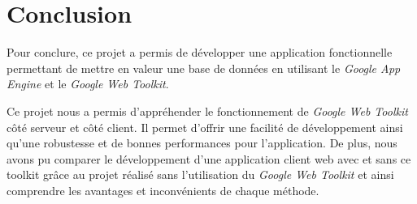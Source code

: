 \chapter{Conclusion}
Pour conclure, ce projet a permis de développer une application fonctionnelle permettant de mettre en valeur une base de données en utilisant le \textit{Google App Engine} et le \textit{Google Web Toolkit}.

Ce projet nous a permis d'appréhender le fonctionnement de \textit{Google Web Toolkit} côté serveur et côté client. Il permet d'offrir une facilité de développement ainsi qu'une robustesse et de bonnes performances pour l'application. De plus, nous avons pu comparer le développement d'une application client web avec et sans ce toolkit grâce au projet réalisé sans l'utilisation du \textit{Google Web Toolkit} et ainsi comprendre les avantages et inconvénients de chaque méthode.
